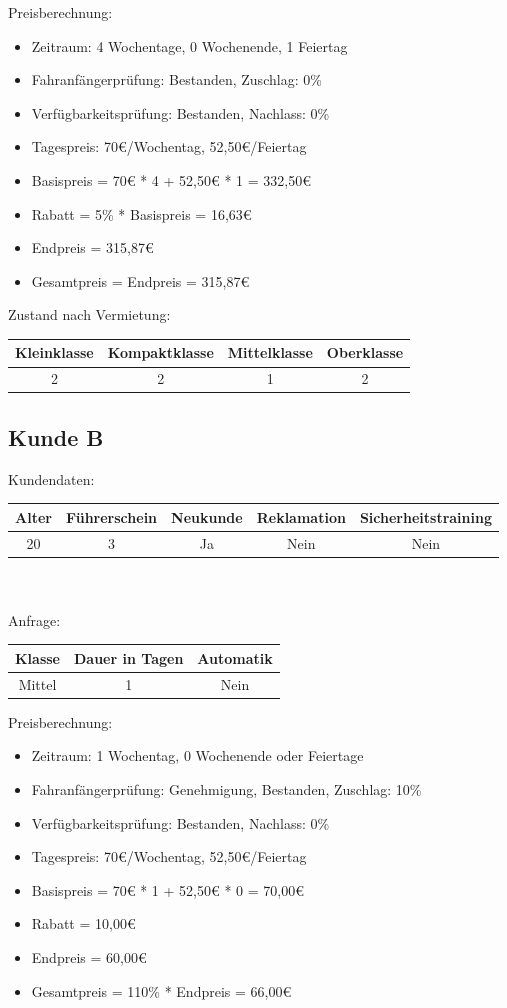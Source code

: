 \vspace{12pt}
Preisberechnung:
\begin{itemize}
	\item Zeitraum: 4 Wochentage, 0 Wochenende, 1 Feiertag
	\item Fahranfängerprüfung: Bestanden, Zuschlag: 0\%
	\item Verfügbarkeitsprüfung: Bestanden, Nachlass: 0\%
	\item Tagespreis: 70€/Wochentag, 52,50€/Feiertag
	\item Basispreis = 70€ * 4 + 52,50€ * 1 = 332,50€
	\item Rabatt = 5\% * Basispreis = 16,63€
	\item Endpreis = 315,87€
	\item Gesamtpreis = Endpreis = 315,87€
\end{itemize}

Zustand nach Vermietung:\\
\begin{tabular}{|c|c|c|c|}
	\hline \textbf{Kleinklasse} & \textbf{Kompaktklasse} & \textbf{Mittelklasse} & \textbf{Oberklasse}  \\ 
	\hline 2 & 2 & 1 & 2 \\ 
	\hline 
\end{tabular} 

\subsection{Kunde B}

Kundendaten:\\
\begin{tabular}{|c|c|c|c|c|}
	\hline \textbf{Alter} & \textbf{Führerschein} & \textbf{Neukunde} & \textbf{Reklamation} & \textbf{Sicherheitstraining} \\ 
	\hline 20 & 3 & Ja & Nein & Nein \\ 
	\hline 
\end{tabular} 
\\\\
Anfrage:\\
\begin{tabular}{|c|c|c|}
	\hline \textbf{Klasse} & \textbf{Dauer in Tagen} & \textbf{Automatik} \\ 
	\hline Mittel & 1 & Nein \\ 
	\hline 
\end{tabular}

Preisberechnung:
\begin{itemize}
	\item Zeitraum: 1 Wochentag, 0 Wochenende oder Feiertage
	\item Fahranfängerprüfung: Genehmigung, Bestanden, Zuschlag: 10\%
	\item Verfügbarkeitsprüfung: Bestanden, Nachlass: 0\%
	\item Tagespreis: 70€/Wochentag, 52,50€/Feiertag
	\item Basispreis = 70€ * 1 + 52,50€ * 0 = 70,00€
	\item Rabatt = 10,00€
	\item Endpreis = 60,00€
	\item Gesamtpreis = 110\% * Endpreis = 66,00€
\end{itemize}

